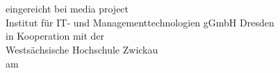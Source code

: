 \thispagestyle{empty}



\centering
\vspace*{2.5cm}
\doublespacing
\textbf{\LARGE{\titleDocument}}\\

\begin{center}
    \normalsize{\Thema}\\
\end{center}

\begin{center}
    \normalsize{eingereicht bei media project}\\
    \normalsize{Institut für IT- und Managementtechnologien gGmbH Dresden}\\
    \normalsize{in Kooperation mit der}\\
    \normalsize{Westsächsische Hochschule Zwickau}\\
    \normalsize{am \Abgabedatum}
\end{center}

